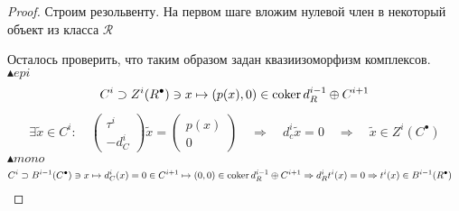 \documentclass[../main.tex]{subfiles}
\begin{document}
\begin{proof}
Строим резольвенту. На первом шаге вложим нулевой член в некоторый объект из класса $\mathcal{R}$
\bee
{}
\eee
\bee
{}
\eee
\bee
{}
\eee
Осталось проверить, что таким образом задан квазиизоморфизм комплексов.\\ 
$\blacktriangle epi$
\begin{align*}
    C^i \supset Z^i(R^\bullet) \ni x \mapsto (p(x), 0) \in \operatorname{coker} d^{i-1}_R\oplus C^{i+1}
\end{align*}
\begin{align*}
    \exists \widetilde{x}  \in C^i \colon \quad
                          \begin{pmatrix} \tau^i \\ -d^{i}_C \end{pmatrix} \widetilde{x} = \begin{pmatrix} p(x) \\ 0 \end{pmatrix} \quad \Rightarrow \quad d_c^i\widetilde{x} = 0 \quad \Rightarrow \quad \widetilde{x} \in Z^i(C^\bullet)
\end{align*}
$\blacktriangle mono$
\begin{align*}
    C^{i} \supset B^{i-1}(C^\bullet) \ni x \mapsto d^i_C(x) = 0 \in C^{i+1} \mapsto (0, 0) \in \operatorname{coker} d^{i-1}_R\oplus C^{i+1} & \Rightarrow d^i_Rt^i(x) = 0 \Rightarrow t^i(x) \in B^{i-1}(R^\bullet)
\end{align*}
\end{proof}
\end{document}
